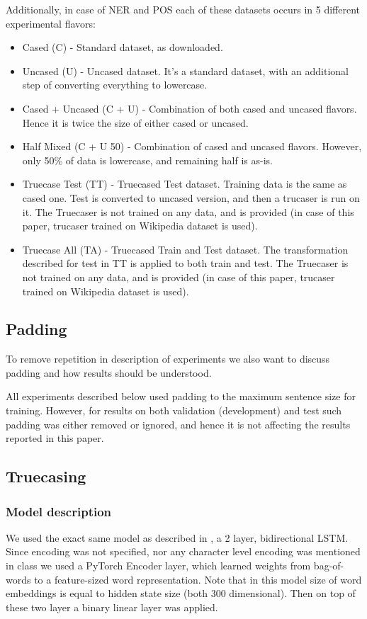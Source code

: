 \documentclass[11pt,a4paper]{article}
\begin{document}
Additionally, in case of NER and POS each of these datasets occurs in 5 different experimental flavors:
\begin{itemize}
    \item Cased (C) - Standard dataset, as downloaded.
    \item Uncased (U) - Uncased dataset. It's a standard dataset, with an additional step of converting everything to lowercase.
    \item Cased + Uncased (C + U) - Combination of both cased and uncased flavors. Hence it is twice the size of either cased or uncased.
    \item Half Mixed (C + U 50) - Combination of cased and uncased flavors. However, only 50\% of data is lowercase, and remaining half is as-is.
    \item Truecase Test (TT) - Truecased Test dataset. Training data is the same as cased one. Test is converted to uncased version, and then a trucaser is run on it. The Truecaser is not trained on any data, and is provided (in case of this paper, trucaser trained on Wikipedia dataset is used).
    \item Truecase All (TA) - Truecased Train and Test dataset. The transformation described for test in TT is applied to both train and test. The Truecaser is not trained on any data, and is provided (in case of this paper, trucaser trained on Wikipedia dataset is used).
\end{itemize}

\subsection{Padding}
To remove repetition in description of experiments we also want to discuss padding and how results should be understood.

All experiments described below used padding to the maximum sentence size for training. However, for results on both validation (development) and test such padding was either removed or ignored, and hence it is not affecting the results reported in this paper.

\subsection{Truecasing}
\label{sec:exp-truecase}

    \subsubsection{Model description}
    We used the exact same model as described in \cite{susanto-etal-2016-learning}, a 2 layer, bidirectional LSTM. Since encoding was not specified, nor any character level encoding was mentioned in class we used a PyTorch \cite{pytorch} Encoder layer, which learned weights from bag-of-words to a feature-sized word representation. Note that in this model size of word embeddings is equal to hidden state size (both 300 dimensional). Then on top of these two layer a binary linear layer was applied.
\end{document}
